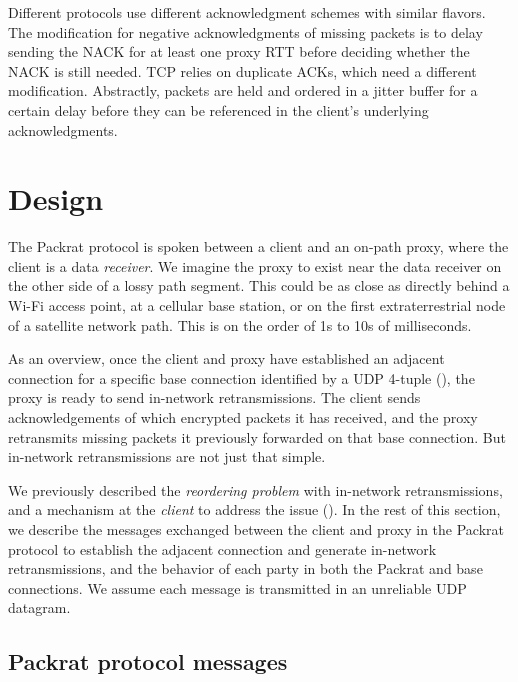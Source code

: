 Different protocols use different acknowledgment schemes with similar flavors.
The modification for negative acknowledgments of missing packets is to delay
sending the NACK for at least one proxy RTT before deciding whether the NACK is
still needed. TCP relies on duplicate ACKs, which need a different
modification. Abstractly, packets are held and ordered in a jitter buffer for a
certain delay before they can be referenced in the client's underlying
acknowledgments.

\section{Design}
\label{sec:packrat:design}

The Packrat protocol is spoken between a client and an on-path proxy, where the
client is a data \textit{receiver}. We imagine the proxy to exist near the data
receiver on the other side of a lossy path segment. This could be as close as
directly behind a Wi-Fi access point, at a cellular base station, or on the
first extraterrestrial node of a satellite network path. This is on the order
of 1s to 10s of milliseconds.

As an overview, once the client and proxy have established an adjacent
connection for a specific base connection identified by a UDP 4-tuple
(), the
proxy is ready to send in-network retransmissions. The client sends
acknowledgements of which encrypted packets it has received, and the proxy retransmits missing
packets it previously forwarded on that base connection.
But in-network retransmissions are not just that simple.

We previously described the \textit{reordering problem} with in-network
retransmissions, and a mechanism at the \textit{client} to address the issue
().
In the rest of this section, we describe the messages
exchanged between the client and proxy in the Packrat protocol to establish the
adjacent connection and generate in-network retransmissions,
and the behavior of each party in both the Packrat and base
connections. We assume each message is transmitted in an unreliable UDP
datagram.

\subsection{Packrat protocol messages}
\label{sec:packrat:design:messages}



